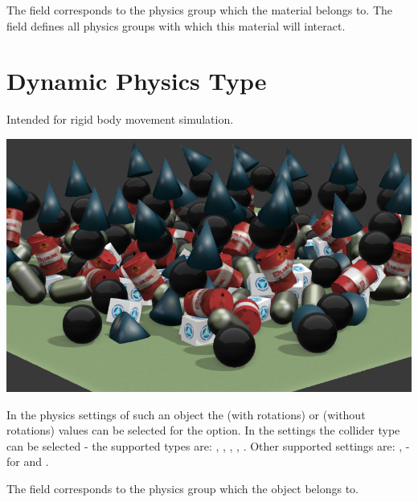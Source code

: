 \documentclass[a4paper,12pt,oneside]{sphinxmanual}
\begin{document}
\begin{DUlineblock}{0em}
\item[] 
\end{DUlineblock}

The  field corresponds to the physics group which the material belongs to. The  field defines all physics groups with which this material will interact.


\section{Dynamic Physics Type}
\label{physics:id4}
Intended for rigid body movement simulation.

\includegraphics[width=1.000\linewidth]{physics_dynamic.jpg}

\begin{DUlineblock}{0em}
\item[] 
\end{DUlineblock}

In the physics settings of such an object the  (with rotations) or  (without rotations) values can be selected for the  option. In the  settings the collider type can be selected - the supported types are: , , , , . Other supported settings are: ,  - for  and .

The  field corresponds to the physics group which the object belongs to.
\end{document}
